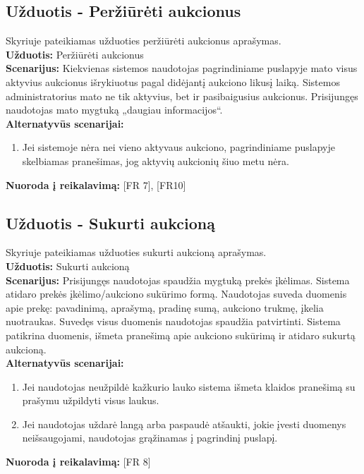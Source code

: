\documentclass{VUMIFPSkursinis}
\begin{document}
	\subsection{Užduotis - Peržiūrėti aukcionus}
	Skyriuje pateikiamas užduoties peržiūrėti aukcionus aprašymas.\\
	\textbf{Užduotis:}  Peržiūrėti aukcionus \\
	\textbf{Scenarijus:} Kiekvienas sistemos naudotojas pagrindiniame puslapyje mato visus aktyvius aukcionus išrykiuotus pagal didėjantį aukciono likusį laiką. Sistemos administratorius mato ne tik aktyvius, bet ir pasibaigusius aukcionus. Prisijungęs naudotojas mato mygtuką „daugiau informacijos“. \\
	\textbf{Alternatyvūs scenarijai:}
	\begin{enumerate}
		\item Jei sistemoje nėra nei vieno aktyvaus aukciono, pagrindiniame puslapyje skelbiamas pranešimas, jog aktyvių aukcionių šiuo metu nėra.
	\end{enumerate}
	\textbf{Nuoroda į reikalavimą: } [FR 7], [FR10]

	\subsection{Užduotis - Sukurti aukcioną}
	Skyriuje pateikiamas užduoties sukurti aukcioną aprašymas.\\
	\textbf{Užduotis:}  Sukurti aukcioną \\
	\textbf{Scenarijus:}  Prisijungęs naudotojas spaudžia mygtuką prekės įkėlimas. Sistema atidaro prekės įkėlimo/aukciono sukūrimo formą. Naudotojas suveda duomenis apie prekę: pavadinimą, aprašymą, pradinę sumą, aukciono trukmę, įkelia nuotraukas. Suvedęs visus duomenis naudotojas spaudžia patvirtinti. Sistema patikrina duomenis, išmeta pranešimą apie aukciono sukūrimą ir atidaro sukurtą aukcioną.\\
	\textbf{Alternatyvūs scenarijai:}
	\begin{enumerate}
		\item Jei naudotojas neužpildė kažkurio lauko sistema išmeta klaidos pranešimą su prašymu užpildyti visus laukus.
		\item Jei naudotojas uždarė langą arba paspaudė atšaukti, jokie įvesti duomenys neišsaugojami, naudotojas grąžinamas į pagrindinį puslapį.
	\end{enumerate}
	\textbf{Nuoroda į reikalavimą: } [FR 8]
\end{document}
